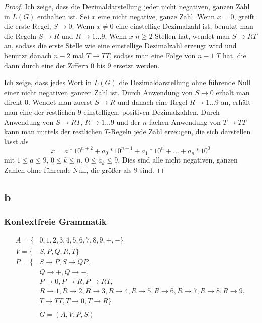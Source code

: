 \documentclass[a4paper,10pt]{article}
\begin{document}
\begin{proof}
 Ich zeige, dass die Dezimaldarstellung jeder nicht negativen, ganzen Zahl in $L(G)$ enthalten ist.
 Sei $x$ eine nicht negative, ganze Zahl.
 Wenn $x = 0$, greift die erste Regel, $S \rightarrow 0$.
 Wenn $x \ne 0$ eine einstellige Dezimalzahl ist, benutzt man die Regeln $S \rightarrow R$ und $R \rightarrow 1 \dots 9$.
 Wenn $x$ $n \ge 2$ Stellen hat, wendet man $S \rightarrow RT$ an, sodass die erste Stelle wie eine einstellige Dezimalzahl erzeugt wird und benutzt danach $n - 2$ mal $T \rightarrow TT$, sodass man eine Folge von $n - 1$ $T$ hat, die dann durch eine der Ziffern $0$ bis $9$ ersetzt werden.

 Ich zeige, dass jedes Wort in $L(G)$ die Dezimaldarstellung ohne führende Null einer nicht negativen ganzen Zahl ist.
 Durch Anwendung von $S \rightarrow 0$ erhält man direkt $0$.
 Wendet man zuerst $S \rightarrow R$ und danach eine Regel $R \rightarrow 1 \dots 9$ an, erhält man eine der restlichen 9 einstelligen, positiven Dezimalzahlen.
 Durch Anwendung von $S \rightarrow RT$, $R \rightarrow 1 \dots 9$ und der $n$-fachen Anwendung von $T \rightarrow TT$ kann man mittels der restlichen $T$-Regeln jede Zahl erzeugen, die sich darstellen lässt als
 \begin{equation}
  x = a * 10^{n + 2} + a_0 * 10^{n + 1} + a_1 * 10^{n} + \dots + a_n * 10^0
 \end{equation}
 mit $1 \le a \le 9$, $0 \le k \le n$, $0 \le a_k \le 9$.
 Dies sind alle nicht negativen, ganzen Zahlen ohne führende Null, die größer als $9$ sind.
\end{proof}

\subsection*{b}

\subsubsection*{Kontextfreie Grammatik}

\begin{align*}
 A = \{&0, 1, 2, 3, 4, 5, 6, 7, 8, 9, +, -\}\\
 V = \{&S, P, Q, R, T\}\\
 P = \{&S \rightarrow P, S \rightarrow QP,\\
 & Q \rightarrow +, Q \rightarrow -,\\
 & P \rightarrow 0, P \rightarrow R, P \rightarrow RT,\\
 & R \rightarrow 1, R \rightarrow 2, R \rightarrow 3, R \rightarrow 4, R \rightarrow 5, R \rightarrow 6, R \rightarrow 7, R \rightarrow 8, R \rightarrow 9,\\
 & T \rightarrow TT, T \rightarrow 0, T \rightarrow R\}\\
 \\
 & G = (A, V, P, S)
\end{align*}
\end{document}
